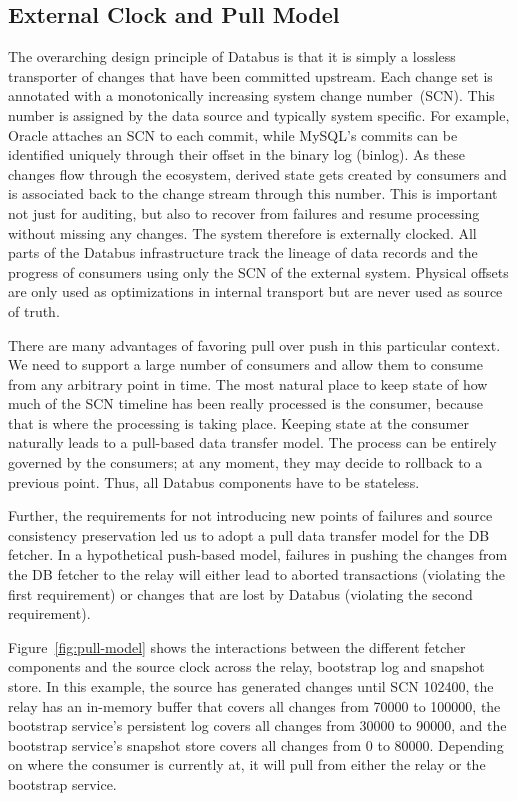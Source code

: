 \subsection{External Clock and Pull Model}

The overarching design principle of Databus is that it is simply a lossless transporter of changes that have been committed upstream. Each change set is annotated with a monotonically increasing system change number~(SCN). This number is assigned by the data source and typically system specific. For example, Oracle attaches an SCN to each commit, while MySQL's commits can be identified uniquely through their offset in the binary log (binlog). As these changes flow through the ecosystem, derived state gets created by consumers and is associated back to the change stream through this number. This is important not just for auditing, but also to recover from failures and resume processing without missing any changes.  The system therefore is externally clocked. All parts of the Databus infrastructure track the lineage of data records and the progress of consumers using only the SCN of the external system. Physical offsets are only used as optimizations in internal transport but are never used as source of truth. 

There are many advantages of favoring pull over push in this particular context. We need to support a large number of consumers and allow them to consume from any arbitrary point in time. The most natural place to keep state of how much of the SCN timeline has been really processed is the consumer, because that is where the processing is taking place. Keeping state at the consumer naturally leads to a pull-based data transfer model. 
The process can be entirely governed by the consumers; at any moment, they may decide to rollback to a previous point. 
Thus, all Databus components have to be stateless. 

Further, the requirements for not introducing new points of failures and source consistency preservation led us to adopt a pull data transfer model for the DB fetcher. In a hypothetical push-based model, failures in pushing the changes from the DB fetcher to the relay will either lead to aborted transactions (violating the first requirement) or changes that are lost by Databus (violating the second requirement). 

Figure~\ref{fig:pull-model} shows the interactions between the different fetcher components and the source clock across the relay, bootstrap log and snapshot store. In this example, the source has generated changes until SCN 102400, the relay has an in-memory buffer that covers all changes from 70000 to 100000, the bootstrap service's persistent log covers all changes from 30000 to 90000, and the bootstrap service's snapshot store covers all changes from 0 to 80000. Depending on where the consumer is currently at, it will pull from either the relay or the bootstrap service. 

